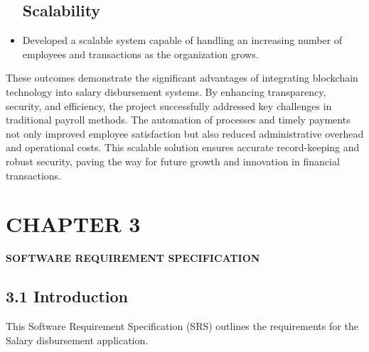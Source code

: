 \documentclass[12pt]{report}
\begin{document}
\begin{center}
\begin{itemize}
    \subsection*{Scalability}
    \item Developed a scalable system capable of handling an increasing number of employees and transactions as the organization grows.
\end{itemize}

These outcomes demonstrate the significant advantages of integrating blockchain technology into salary disbursement systems. By enhancing transparency, security, and efficiency, the project successfully addressed key challenges in traditional payroll methods. The automation of processes and timely payments not only improved employee satisfaction but also reduced administrative overhead and operational costs. This scalable solution ensures accurate record-keeping and robust security, paving the way for future growth and innovation in financial transactions.
\end{center}

\newpage
\section*{CHAPTER 3}
\vspace{1EM}
\begin{center}
    \textbf{\fontsize{16pt}{21.6pt}\selectfont SOFTWARE REQUIREMENT SPECIFICATION}  %
\end{center}
\subsection*{3.1 Introduction}
\begin{center}    
    \justify 
This Software Requirement Specification (SRS) outlines the requirements for the Salary disbursement application.
\end{center}
\vspace{0.7em}
\end{document}
